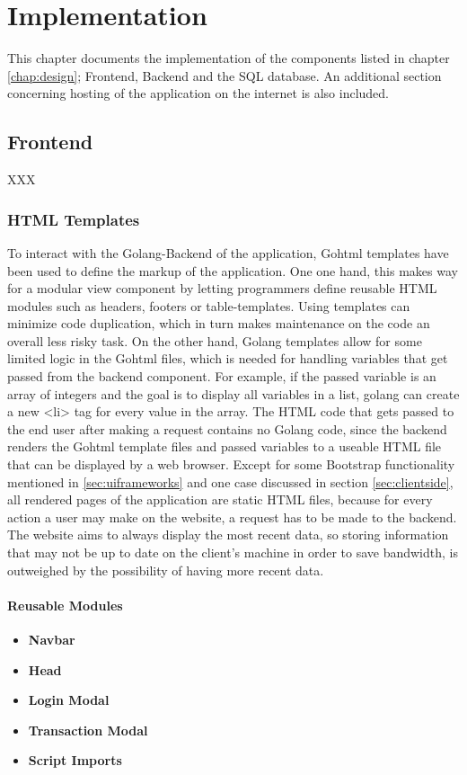 \chapter{Implementation}
This chapter documents the implementation of the components listed in chapter \ref{chap:design}; Frontend, Backend and the SQL database. An additional section concerning hosting of the application on the internet is also included.
\section{Frontend}
XXX
\subsection{HTML Templates}
To interact with the Golang-Backend of the application, Gohtml templates have been used to define the markup of the application. One one hand, this makes way for a modular view component by letting programmers define reusable HTML modules such as headers, footers or table-templates. Using templates can minimize code duplication, which in turn makes maintenance on the code an overall less risky task. On the other hand, Golang templates allow for some limited logic in the Gohtml files, which is needed for handling variables that get passed from the backend component. For example, if the passed variable is an array of integers and the goal is to display all variables in a list, golang can create a new <li> tag for every value in the array. The HTML code that gets passed to the end user after making a request contains no Golang code, since the backend renders the Gohtml template files and passed variables to a useable HTML file that can be displayed by a web browser. Except for some Bootstrap functionality mentioned in \ref{sec:uiframeworks} and one case discussed in section \ref{sec:clientside}, all rendered pages of the application are static HTML files, because for every action a user may make on the website, a request has to be made to the backend. The website aims to always display the most recent data, so storing information that may not be up to date on the client's machine in order to save bandwidth, is outweighed by the possibility of having more recent data. 

\subsubsection{Reusable Modules}
\begin{itemize}
\item \textbf{Navbar}
\item \textbf{Head}
\item \textbf{Login Modal}
\item \textbf{Transaction Modal}
\item \textbf{Script Imports}
\end{itemize}


